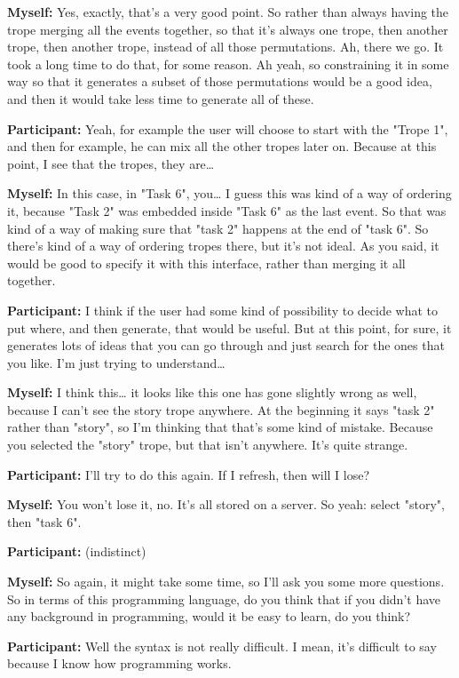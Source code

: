 \documentclass[11pt]{report}
\newcommand{\llabel}[1]{\hypertarget{llineno:#1}{\linelabel{#1}}}
\begin{document}
\begin{linenumbers}
\textbf{Myself:} Yes, exactly, that's a very good point. So rather than always having the trope merging all the events together, so that it's always one trope, then another trope, then another trope, instead of all those permutations. Ah, there we go. It took a long time to do that, for some reason. Ah yeah, so constraining it in some way so that it generates a subset of those permutations would be a good idea, and then it would take less time to generate all of these.

\textbf{Participant:} Yeah, for example the user will choose to start with the "Trope 1", and then for example, he can mix all the other tropes later on. Because at this point, I see that the tropes, they are\ldots{}

\textbf{Myself:} In this case, in "Task 6", you\ldots{} I guess this was kind of a way of ordering it, because "Task 2" was embedded inside "Task 6" as the last event. So that was kind of a way of making sure that "task 2" happens at the end of "task 6". So there's kind of a way of ordering tropes there, but it's not ideal. As you said, it would be good to specify it with this interface, rather than merging it all together.

\textbf{Participant:} I think if the user had some kind of possibility to decide what to put where, and then generate, that would be useful. But at this point, for sure, it generates lots of ideas that you can go through and just search for the ones that you like. I'm just trying to understand\ldots{}

\textbf{Myself:} I think this\ldots{} it looks like this one has gone slightly wrong as well, because I can't see the story trope anywhere. At the beginning it says "task 2" rather than "story", so I'm thinking that that's some kind of mistake. Because you selected the "story" trope, but that isn't anywhere. It's quite strange.

\textbf{Participant:} I'll try to do this again. If I refresh, then will I lose?

\textbf{Myself:} You won't lose it, no. It's all stored on a server. So yeah: select "story", then "task 6".

\textbf{Participant:} (indistinct)

\textbf{Myself:} So again, it might take some time, so I'll ask you some more questions. So in terms of this programming language, do you think that if you didn't have any background in programming, would it be easy to learn, do you think?

\textbf{Participant:} Well the syntax is not really difficult. I mean, it's
difficult to say because I know how programming works.\llabel{lne:use1f}


\end{linenumbers}
\end{document}
